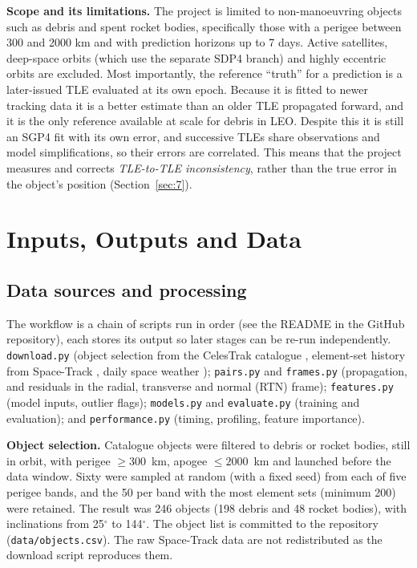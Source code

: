 \documentclass[11pt, a4paper]{article}
\begin{document}
\textbf{Scope and its limitations.} The project is limited to non-manoeuvring objects such as debris and spent rocket bodies, specifically those with a perigee between 300 and 2000 km and with prediction horizons up to 7 days. Active satellites, deep-space orbits (which use the separate SDP4 branch) and highly eccentric orbits are excluded. Most importantly, the reference ``truth'' for a prediction is a later-issued TLE evaluated at its own epoch. Because it is fitted to newer tracking data it is a better estimate than an older TLE propagated forward, and it is the only reference available at scale for debris in LEO. Despite this it is still an SGP4 fit with its own error, and successive TLEs share observations and model simplifications, so their errors are correlated. This means that the project measures and corrects \emph{TLE-to-TLE inconsistency}, rather than the true error in the object's position (Section~\ref{sec:7}).

\section{Inputs, Outputs and Data}\label{sec:2}

\subsection{Data sources and processing}

The workflow is a chain of scripts run in order (see the README in the GitHub repository), each stores its output so later stages can be re-run independently. \texttt{download.py} (object selection from the CelesTrak catalogue \cite{celestrak_satcat}, element-set history from Space-Track \cite{spacetrack}, daily space weather \cite{celestrak_sw}); \texttt{pairs.py} and \texttt{frames.py} (propagation, and residuals in the radial, transverse and normal (RTN) frame); \texttt{features.py} (model inputs, outlier flags); \texttt{models.py} and \texttt{evaluate.py} (training and evaluation); and \texttt{performance.py} (timing, profiling, feature importance).

\textbf{Object selection.} Catalogue objects were filtered to debris or rocket bodies, still in orbit, with perigee $\geq 300$~km, apogee $\leq 2000$~km and launched before the data window. Sixty were sampled at random (with a fixed seed) from each of five perigee bands, and the 50 per band with the most element sets (minimum 200) were retained. The result was 246 objects (198 debris and 48 rocket bodies), with inclinations from 25$^\circ$ to 144$^\circ$. The object list is committed to the repository (\texttt{data/objects.csv}). The raw Space-Track data are not redistributed as the download script reproduces them.
\end{document}
